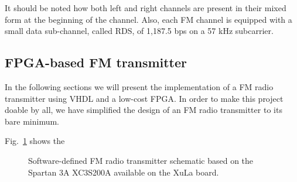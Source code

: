 \documentclass[13pt]{extreport}
\begin{document}
It should be noted how both left and right channels are present in their mixed form at the beginning of the channel. Also, each FM channel is equipped with a small data sub-channel, called RDS, of 1,187.5 bps on a 57 kHz subcarrier.

\subsection{FPGA-based FM transmitter}
In the following sections we will present the implementation of a FM radio transmitter using VHDL and a low-cost FPGA. In order to make this project doable by all, we have simplified the design of an FM radio transmitter to its bare minimum.

Fig.~\ref{sdr} shows the

\usetikzlibrary{circuits.ee.IEC} %
\begin{figure}
    \centering
{}
\caption{Software-defined FM radio transmitter schematic based on the Spartan 3A XC3S200A available on the XuLa board.}
\label{sdr}
\end{figure}













\end{document}
